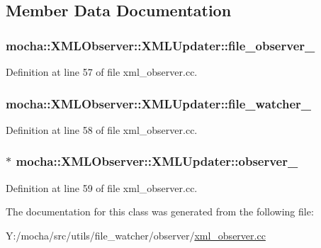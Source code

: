 \subsection{Member Data Documentation}
\hypertarget{classmocha_1_1_x_m_l_observer_1_1_x_m_l_updater_a55d86bb53c933323f123e1ad9bd4844c}{
\subsubsection[{file\_\-observer\_\-}]{ {\bf mocha::XMLObserver::XMLUpdater::file\_\-observer\_\-}}}
\label{classmocha_1_1_x_m_l_observer_1_1_x_m_l_updater_a55d86bb53c933323f123e1ad9bd4844c}


Definition at line 57 of file xml\_\-observer.cc.

\hypertarget{classmocha_1_1_x_m_l_observer_1_1_x_m_l_updater_aa775c8ff2cf07901e5e2b615302a1789}{
\subsubsection[{file\_\-watcher\_\-}]{ {\bf mocha::XMLObserver::XMLUpdater::file\_\-watcher\_\-}}}
\label{classmocha_1_1_x_m_l_observer_1_1_x_m_l_updater_aa775c8ff2cf07901e5e2b615302a1789}


Definition at line 58 of file xml\_\-observer.cc.

\hypertarget{classmocha_1_1_x_m_l_observer_1_1_x_m_l_updater_ad29a952b6d6a56e7780b442d655f9810}{
\subsubsection[{observer\_\-}]{$\ast$ {\bf mocha::XMLObserver::XMLUpdater::observer\_\-}}}
\label{classmocha_1_1_x_m_l_observer_1_1_x_m_l_updater_ad29a952b6d6a56e7780b442d655f9810}


Definition at line 59 of file xml\_\-observer.cc.



The documentation for this class was generated from the following file:\begin{DoxyCompactItemize}
\item 
Y:/mocha/src/utils/file\_\-watcher/observer/\hyperlink{xml__observer_8cc}{xml\_\-observer.cc}\end{DoxyCompactItemize}
